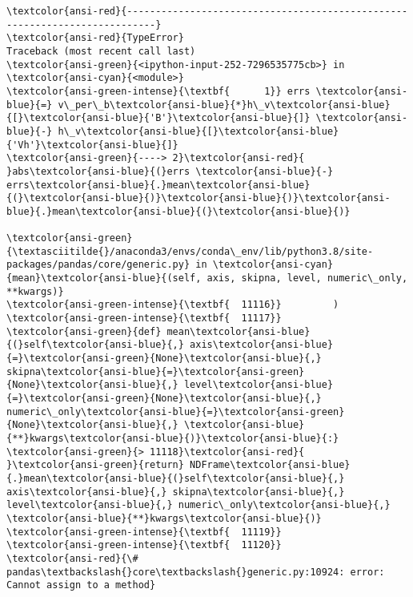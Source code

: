 \documentclass[11pt]{article}
\begin{document}
    \begin{Verbatim}[commandchars=\\\{\}, frame=single, framerule=2mm, rulecolor=\color{outerrorbackground}]
\textcolor{ansi-red}{---------------------------------------------------------------------------}
\textcolor{ansi-red}{TypeError}                                 Traceback (most recent call last)
\textcolor{ansi-green}{<ipython-input-252-7296535775cb>} in \textcolor{ansi-cyan}{<module>}
\textcolor{ansi-green-intense}{\textbf{      1}} errs \textcolor{ansi-blue}{=} v\_per\_b\textcolor{ansi-blue}{*}h\_v\textcolor{ansi-blue}{[}\textcolor{ansi-blue}{'B'}\textcolor{ansi-blue}{]} \textcolor{ansi-blue}{-} h\_v\textcolor{ansi-blue}{[}\textcolor{ansi-blue}{'Vh'}\textcolor{ansi-blue}{]}
\textcolor{ansi-green}{----> 2}\textcolor{ansi-red}{ }abs\textcolor{ansi-blue}{(}errs \textcolor{ansi-blue}{-} errs\textcolor{ansi-blue}{.}mean\textcolor{ansi-blue}{(}\textcolor{ansi-blue}{)}\textcolor{ansi-blue}{)}\textcolor{ansi-blue}{.}mean\textcolor{ansi-blue}{(}\textcolor{ansi-blue}{)}

\textcolor{ansi-green}{\textasciitilde{}/anaconda3/envs/conda\_env/lib/python3.8/site-packages/pandas/core/generic.py} in \textcolor{ansi-cyan}{mean}\textcolor{ansi-blue}{(self, axis, skipna, level, numeric\_only, **kwargs)}
\textcolor{ansi-green-intense}{\textbf{  11116}}         )
\textcolor{ansi-green-intense}{\textbf{  11117}}         \textcolor{ansi-green}{def} mean\textcolor{ansi-blue}{(}self\textcolor{ansi-blue}{,} axis\textcolor{ansi-blue}{=}\textcolor{ansi-green}{None}\textcolor{ansi-blue}{,} skipna\textcolor{ansi-blue}{=}\textcolor{ansi-green}{None}\textcolor{ansi-blue}{,} level\textcolor{ansi-blue}{=}\textcolor{ansi-green}{None}\textcolor{ansi-blue}{,} numeric\_only\textcolor{ansi-blue}{=}\textcolor{ansi-green}{None}\textcolor{ansi-blue}{,} \textcolor{ansi-blue}{**}kwargs\textcolor{ansi-blue}{)}\textcolor{ansi-blue}{:}
\textcolor{ansi-green}{> 11118}\textcolor{ansi-red}{             }\textcolor{ansi-green}{return} NDFrame\textcolor{ansi-blue}{.}mean\textcolor{ansi-blue}{(}self\textcolor{ansi-blue}{,} axis\textcolor{ansi-blue}{,} skipna\textcolor{ansi-blue}{,} level\textcolor{ansi-blue}{,} numeric\_only\textcolor{ansi-blue}{,} \textcolor{ansi-blue}{**}kwargs\textcolor{ansi-blue}{)}
\textcolor{ansi-green-intense}{\textbf{  11119}} 
\textcolor{ansi-green-intense}{\textbf{  11120}}         \textcolor{ansi-red}{\# pandas\textbackslash{}core\textbackslash{}generic.py:10924: error: Cannot assign to a method}


\end{Verbatim}
\end{document}
